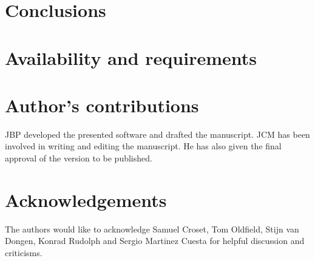 \documentclass[10pt]{bmc_article}
\newenvironment{bmcformat}{\baselineskip20pt\sloppy\setboolean{publ}{false}}{\baselineskip20pt\sloppy}
\begin{document}
\begin{bmcformat}
\section{Conclusions}

\section{Availability and requirements}





\bigskip

\section*{Author's contributions}
JBP developed the presented software and drafted the manuscript. JCM has been involved in writing and editing the manuscript. He has also given the final approval of the version to be published.

    

\section*{Acknowledgements}
The authors would like to acknowledge Samuel Croset, Tom Oldfield, Stijn van Dongen, Konrad Rudolph and Sergio Martinez Cuesta for helpful discussion and criticisms.
 

\newpage
{
   }     %


\end{bmcformat}
\end{document}
